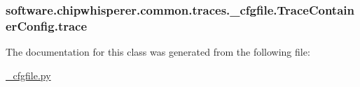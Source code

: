 \subsubsection[{trace}]{\setlength{\rightskip}{0pt plus 5cm}software.\+chipwhisperer.\+common.\+traces.\+\_\+cfgfile.\+Trace\+Container\+Config.\+trace}\label{classsoftware_1_1chipwhisperer_1_1common_1_1traces_1_1__cfgfile_1_1TraceContainerConfig_aa72086d18253a4c676edfc39e11ca2ef}


The documentation for this class was generated from the following file\+:\begin{DoxyCompactItemize}
\item 
\hyperlink{__cfgfile_8py}{\+\_\+cfgfile.\+py}\end{DoxyCompactItemize}

